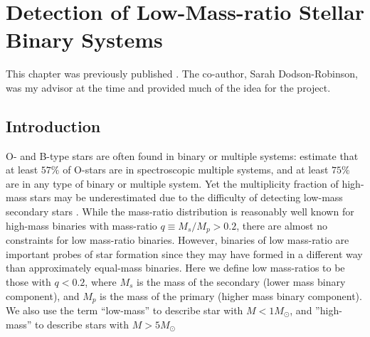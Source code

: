 

\chapter{Detection of Low-Mass-ratio Stellar Binary Systems}
\label{chap:pilot}
This chapter was previously published \citep{Gullikson2013_2}. The co-author, Sarah Dodson-Robinson, was my advisor at the time and provided much of the idea for the project.


\section{Introduction}
O- and B-type stars are often found in binary or
multiple systems: \cite{Mason2009} estimate that at least $57\%$ of O-stars are
in spectroscopic multiple systems, and at least $75\%$ are in any type of binary or multiple system.
Yet the multiplicity fraction of high-mass stars may be underestimated due to the difficulty of detecting low-mass secondary stars \citep{Sana2011}.  While the mass-ratio distribution
is reasonably well known for high-mass binaries with mass-ratio $q \equiv M_s/M_p > 0.2$, there are almost no
constraints for low mass-ratio binaries. However, binaries of low mass-ratio are important probes of star formation since they may have
formed in a different way than approximately equal-mass binaries. Here we define low mass-ratios to be 
those with $q < 0.2$, where $M_s$ is the mass of the secondary (lower mass binary component), and $M_p$ 
is the mass of the primary (higher mass binary component). We also use the term ``low-mass'' to 
describe star with $M < 1 M_{\odot}$, and ''high-mass'' to describe stars with $M > 5 
M_{\odot}$


